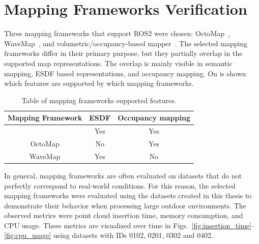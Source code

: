 \section{Mapping Frameworks Verification}

Three mapping frameworks that support \ac{ROS2} were chosen: OctoMap~\cite{bk_octomap}, WaveMap~\cite{bk_wavemap}, %
and volumetric/occupancy-based mapper~\cite{bk_capek_masters}. The selected mapping frameworks differ in their primary purpose, but they partially overlap in the supported map representations. The overlap is mainly visible in semantic mapping, \ac{ESDF} based representations, and occupancy mapping. On  is shown which features are supported by which mapping frameworks.

\begin{table}[!h]
	\centering
	\noindent
	\begin{tabular}{c|c|c}
		Mapping Framework 
		& \ac{ESDF} & Occupancy mapping \\
		\hline
		\makecell{Volumetric/occupancy-based mapper} 
		& Yes & Yes \\
		OctoMap 
		& No & Yes \\
		WaveMap 
		& Yes & No \\
	\end{tabular}
	\noindent
	\caption{Table of mapping frameworks supported features.}
	\label{tab:supported_mapping_features}
\end{table}

In general, mapping frameworks are often evaluated on datasets that do not perfectly correspond to real-world conditions. For this reason, the selected mapping frameworks were evaluated using the datasets created in this thesis to demonstrate their behavior when processing large outdoor environments. The observed metrics were point cloud insertion time, memory consumption, and CPU usage. These metrics are visualized over time in Figs.~\ref{fig:insertion_time}--\ref{fig:cpu_usage} using datasets with IDs 0102, 0201, 0302 and 0402.

